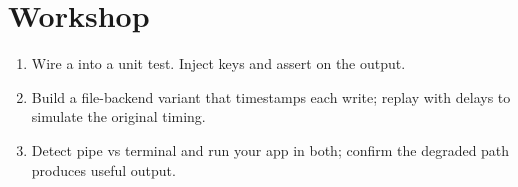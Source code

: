 \section*{Workshop}

\begin{enumerate}[leftmargin=*]
  \item Wire a  into a unit test.
    Inject keys and assert on the output.
  \item Build a file-backend variant that timestamps each
    write; replay with delays to simulate the original
    timing.
  \item Detect pipe vs terminal and run your app in both;
    confirm the degraded path produces useful output.
\end{enumerate}
